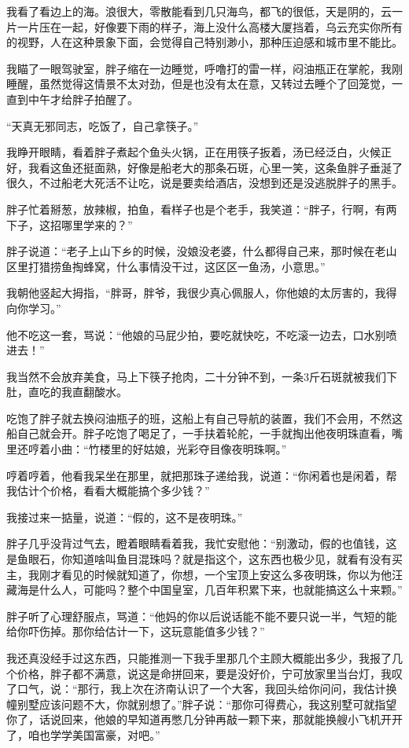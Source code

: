 我看了看边上的海。浪很大，零散能看到几只海鸟，都飞的很低，天是阴的，云一片一片压在一起，好像要下雨的样子，海上没什么高楼大厦挡着，乌云充实你所有的视野，人在这种景象下面，会觉得自己特别渺小，那种压迫感和城市里不能比。

我瞄了一眼驾驶室，胖子缩在一边睡觉，呼噜打的雷一样，闷油瓶正在掌舵，我刚睡醒，虽然觉得这情景不太对劲，但是也没有太在意，又转过去睡个了回笼觉，一直到中午才给胖子拍醒了。

“天真无邪同志，吃饭了，自己拿筷子。”

我睁开眼睛，看着胖子煮起个鱼头火锅，正在用筷子扳着，汤已经泛白，火候正好，我看这鱼还挺面熟，好像是船老大的那条石斑，心里一笑，这条鱼胖子垂涎了很久，不过船老大死活不让吃，说是要卖给酒店，没想到还是没逃脱胖子的黑手。

胖子忙着掰葱，放辣椒，拍鱼，看样子也是个老手，我笑道：“胖子，行啊，有两下子，这招哪里学来的？”

胖子说道：“老子上山下乡的时候，没娘没老婆，什么都得自己来，那时候在老山区里打猎捞鱼掏蜂窝，什么事情没干过，这区区一鱼汤，小意思。”

我朝他竖起大拇指，“胖哥，胖爷，我很少真心佩服人，你他娘的太厉害的，我得向你学习。”

他不吃这一套，骂说：“他娘的马屁少拍，要吃就快吃，不吃滚一边去，口水别喷进去！”

我当然不会放弃美食，马上下筷子抢肉，二十分钟不到，一条3斤石斑就被我们下肚，直吃的我直翻酸水。

吃饱了胖子就去换闷油瓶子的班，这船上有自己导航的装置，我们不会用，不然这船自己就会开。胖子吃饱了喝足了，一手扶着轮舵，一手就掏出他夜明珠直看，嘴里还哼着小曲：“竹楼里的好姑娘，光彩夺目像夜明珠啊。”

哼着哼着，他看我呆坐在那里，就把那珠子递给我，说道：“你闲着也是闲着，帮我估计个价格，看看大概能搞个多少钱？”

我接过来一掂量，说道：“假的，这不是夜明珠。”

胖子几乎没背过气去，瞪着眼睛看着我，我忙安慰他：“别激动，假的也值钱，这是鱼眼石，你知道啥叫鱼目混珠吗？就是指这个，这东西也极少见，就看有没有买主，我刚才看见的时候就知道了，你想，一个宝顶上安这么多夜明珠，你以为他汪藏海是什么人，可能吗？整个中国皇室，几百年积累下来，也就能搞这么十来颗。”

胖子听了心理舒服点，骂道：“他妈的你以后说话能不能不要只说一半，气短的能给你吓伤掉。那你给估计一下，这玩意能值多少钱？”

我还真没经手过这东西，只能推测一下我手里那几个主顾大概能出多少，我报了几个价格，胖子都不满意，说这是命拼回来，要是没好价，宁可放家里当台灯，我叹了口气，说：“那行，我上次在济南认识了一个大客，我回头给你问问，我估计换幢别墅应该问题不大，你就别想了。”胖子说：“那你可得费心，我这别墅可就指望你了，话说回来，他娘的早知道再憋几分钟再敲一颗下来，那就能换艘小飞机开开了，咱也学学美国富豪，对吧。”

